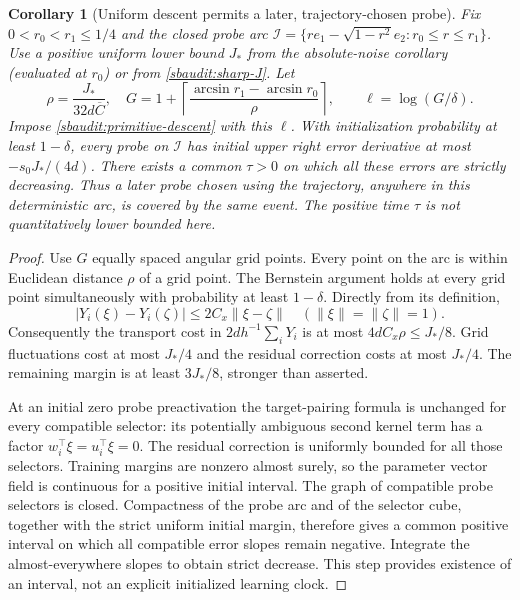 \documentclass{article} %
\theoremstyle{plain}
\newtheorem{corollary}[theorem]{Corollary}
\theoremstyle{definition}
\theoremstyle{remark}
\begin{document}
\begin{corollary}[Uniform descent permits a later, trajectory-chosen probe]
\label{sbaudit:uniform-descent}
Fix $0<r_0<r_1\le1/4$ and the closed probe arc
$\mathcal I=\{re_1-\sqrt{1-r^2}e_2:r_0\le r\le r_1\}$.
Use a positive uniform lower bound $J_*$ from the absolute-noise corollary
(evaluated at $r_0$) or from \eqref{sbaudit:sharp-J}.
Let
\[
 \rho=\frac{J_*}{32d\overline C},\quad
 G=1+\left\lceil\frac{\arcsin r_1-\arcsin r_0}{\rho}\right\rceil,
 \qquad \ell=\log(G/\delta).
\]
Impose \eqref{sbaudit:primitive-descent} with this $\ell$.
With initialization probability at least $1-\delta$, every probe on
$\mathcal I$ has initial upper right error derivative at most
$-s_0J_*/(4d)$. There exists a common $\tau>0$ on which all these errors
are strictly decreasing. Thus a later probe chosen using the trajectory,
anywhere in this deterministic arc, is covered by the same event.
The positive time $\tau$ is not quantitatively lower bounded here.
\end{corollary}
\begin{proof}
Use $G$ equally spaced angular grid points. Every point on the arc is
within Euclidean distance $\rho$ of a grid point. The Bernstein argument
holds at every grid point simultaneously with probability at least
$1-\delta$. Directly from its definition,
\[
 |Y_i(\xi)-Y_i(\zeta)|\le2C_x\|\xi-\zeta\|
 \quad(\|\xi\|=\|\zeta\|=1).
\]
Consequently the transport cost in $2d h^{-1}\sum_iY_i$ is at most
$4dC_x\rho\le J_*/8$. Grid fluctuations cost at most $J_*/4$ and
the residual correction costs at most $J_*/4$. The remaining margin
is at least $3J_*/8$, stronger than asserted.

At an initial zero probe preactivation the target-pairing formula is
unchanged for every compatible selector: its potentially ambiguous
second kernel term has a factor $w_i^\top\xi=u_i^\top\xi=0$.
The residual correction is uniformly bounded for all those selectors.
Training margins are nonzero almost surely, so the parameter vector
field is continuous for a positive initial interval. The graph of
compatible probe selectors is closed. Compactness of the probe arc
and of the selector cube, together with the strict uniform initial
margin, therefore gives a common positive interval on which all
compatible error slopes remain negative. Integrate the almost-everywhere
slopes to obtain strict decrease. This step provides existence of an
interval, not an explicit initialized learning clock.
\end{proof}
\end{document}

